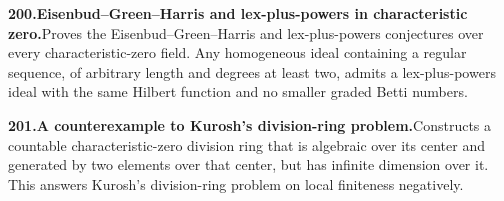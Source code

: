 \documentclass[11pt,a4paper]{article}
\begin{document}
  \par \begin{minipage}{\linewidth}
  \fontsize{10.5}{12.6}\selectfont\RaggedRight
  \hypertarget{result 200}{}
  {\bfseries\textcolor{muted}{200.}\enspace Eisenbud--Green--Harris and lex-plus-powers in characteristic zero.}\enspace Proves the Eisenbud--Green--Harris and lex-plus-powers conjectures over every characteristic-zero field. Any homogeneous ideal containing a regular sequence, of arbitrary length and degrees at least two, admits a lex-plus-powers ideal with the same Hilbert function and no smaller graded Betti numbers.\par
  \end{minipage}\par\vspace{5pt}



  \par \begin{minipage}{\linewidth}
  \fontsize{10.5}{12.6}\selectfont\RaggedRight
  \hypertarget{result 201}{}
  {\bfseries\textcolor{muted}{201.}\enspace A counterexample to Kurosh's division-ring problem.}\enspace Constructs a countable characteristic-zero division ring that is algebraic over its center and generated by two elements over that center, but has infinite dimension over it. This answers Kurosh's division-ring problem on local finiteness negatively.\par
  \end{minipage}\par\vspace{5pt}
\end{document}
